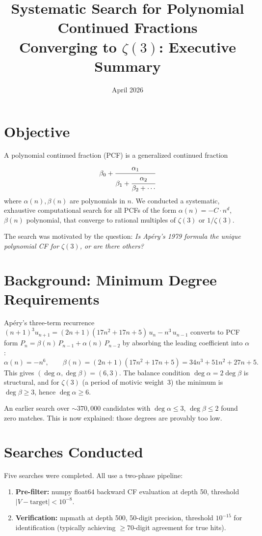 \documentclass[11pt]{article}
\title{Systematic Search for Polynomial Continued Fractions\\
Converging to $\zeta(3)$: Executive Summary}
\date{April 2026}
\begin{document}
\maketitle

\section{Objective}

A polynomial continued fraction (PCF) is a generalized continued fraction
\[
\beta_0 + \cfrac{\alpha_1}{\beta_1 + \cfrac{\alpha_2}{\beta_2 + \cdots}}
\]
where $\alpha(n), \beta(n)$ are polynomials in $n$.  We conducted a
systematic, exhaustive computational search for all PCFs of the form
$\alpha(n) = -C\cdot n^d$, $\beta(n)$ polynomial, that converge to rational
multiples of $\zeta(3)$ or $1/\zeta(3)$.

The search was motivated by the question: \emph{Is Ap\'ery's 1979 formula
the unique polynomial CF for $\zeta(3)$, or are there others?}

\section{Background: Minimum Degree Requirements}

Ap\'ery's three-term recurrence $(n+1)^3 u_{n+1} = (2n+1)(17n^2+17n+5)\,u_n
- n^3\,u_{n-1}$ converts to PCF form
$P_n = \beta(n)\,P_{n-1} + \alpha(n)\,P_{n-2}$ by absorbing the leading
coefficient into $\alpha$:
\[
\alpha(n) = -n^6, \qquad
\beta(n) = (2n+1)(17n^2+17n+5) = 34n^3+51n^2+27n+5.
\]
This gives $(\deg\alpha, \deg\beta) = (6,3)$.  The balance condition
$\deg\alpha = 2\deg\beta$ is structural, and for $\zeta(3)$ (a period of
motivic weight~3) the minimum is $\deg\beta \geq 3$, hence
$\deg\alpha \geq 6$.

An earlier search over $\sim\!370{,}000$ candidates with $\deg\alpha \leq 3$,
$\deg\beta \leq 2$ found zero matches.  This is now explained: those degrees
are provably too low.

\section{Searches Conducted}

Five searches were completed.  All use a two-phase pipeline:
\begin{enumerate}
\item \textbf{Pre-filter:} numpy float64 backward CF evaluation at depth 50,
threshold $|V - \text{target}| < 10^{-8}$.
\item \textbf{Verification:} mpmath at depth 500, 50-digit precision,
threshold $10^{-15}$ for identification (typically achieving $\geq 70$-digit
agreement for true hits).
\end{enumerate}
\end{document}
